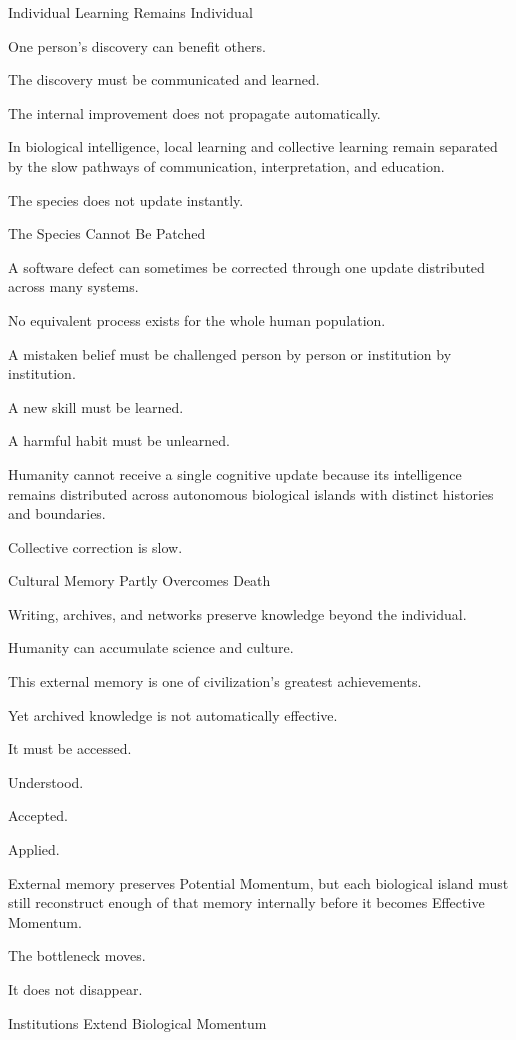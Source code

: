 Individual Learning Remains Individual

One person’s discovery can benefit others.

The discovery must be communicated and learned.

The internal improvement does not propagate automatically.

In biological intelligence, local learning and collective learning remain separated by the slow pathways of communication, interpretation, and education.

The species does not update instantly.

The Species Cannot Be Patched

A software defect can sometimes be corrected through one update distributed across many systems.

No equivalent process exists for the whole human population.

A mistaken belief must be challenged person by person or institution by institution.

A new skill must be learned.

A harmful habit must be unlearned.

Humanity cannot receive a single cognitive update because its intelligence remains distributed across autonomous biological islands with distinct histories and boundaries.

Collective correction is slow.

Cultural Memory Partly Overcomes Death

Writing, archives, and networks preserve knowledge beyond the individual.

Humanity can accumulate science and culture.

This external memory is one of civilization’s greatest achievements.

Yet archived knowledge is not automatically effective.

It must be accessed.

Understood.

Accepted.

Applied.

External memory preserves Potential Momentum, but each biological island must still reconstruct enough of that memory internally before it becomes Effective Momentum.

The bottleneck moves.

It does not disappear.

Institutions Extend Biological Momentum

